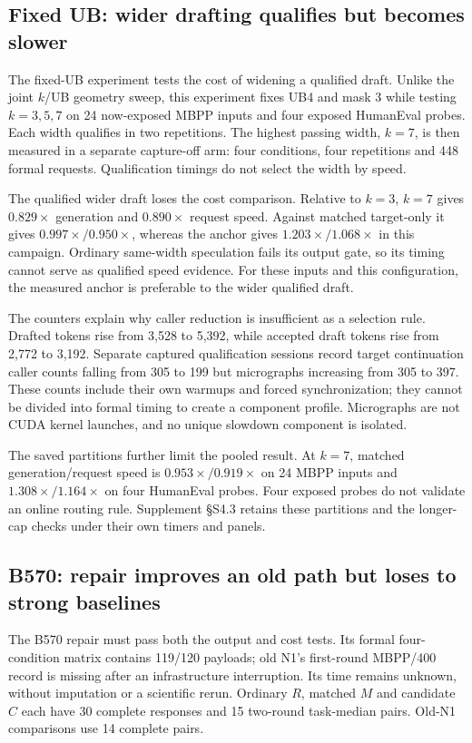 \subsection{Fixed UB: wider drafting qualifies but becomes slower}
The fixed-UB experiment tests the cost of widening a qualified draft. Unlike the joint $k$/UB geometry sweep, this experiment fixes UB4 and mask 3 while testing $k=3,5,7$ on 24 now-exposed MBPP inputs and four exposed HumanEval probes. Each width qualifies in two repetitions. The highest passing width, $k=7$, is then measured in a separate capture-off arm: four conditions, four repetitions and 448 formal requests. Qualification timings do not select the width by speed.

The qualified wider draft loses the cost comparison. Relative to $k=3$, $k=7$ gives $0.829\times$ generation and $0.890\times$ request speed. Against matched target-only it gives $0.997\times/0.950\times$, whereas the anchor gives $1.203\times/1.068\times$ in this campaign. Ordinary same-width speculation fails its output gate, so its timing cannot serve as qualified speed evidence. For these inputs and this configuration, the measured anchor is preferable to the wider qualified draft.

The counters explain why caller reduction is insufficient as a selection rule. Drafted tokens rise from 3,528 to 5,392, while accepted draft tokens rise from 2,772 to 3,192. Separate captured qualification sessions record target continuation caller counts falling from 305 to 199 but micrographs increasing from 305 to 397. These counts include their own warmups and forced synchronization; they cannot be divided into formal timing to create a component profile. Micrographs are not CUDA kernel launches, and no unique slowdown component is isolated.

The saved partitions further limit the pooled result. At $k=7$, matched generation/request speed is $0.953\times/0.919\times$ on 24 MBPP inputs and $1.308\times/1.164\times$ on four HumanEval probes. Four exposed probes do not validate an online routing rule. Supplement \S S4.3 retains these partitions and the longer-cap checks under their own timers and panels.

\subsection{B570: repair improves an old path but loses to strong baselines}
The B570 repair must pass both the output and cost tests. Its formal four-condition matrix contains 119/120 payloads; old N1's first-round MBPP/400 record is missing after an infrastructure interruption. Its time remains unknown, without imputation or a scientific rerun. Ordinary $R$, matched $M$ and candidate $C$ each have 30 complete responses and 15 two-round task-median pairs. Old-N1 comparisons use 14 complete pairs.

